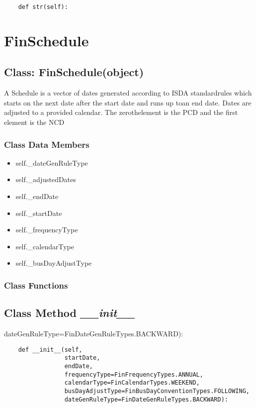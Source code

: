 \documentclass[twoside,11pt]{book}
\begin{document}
\begin{lstlisting}
    def str(self):
\end{lstlisting}

\newpage
\section{FinSchedule}

\subsection{Class: FinSchedule(object)}
A Schedule is a vector of dates generated according to ISDA standardrules which starts on the next date after the start date and runs up toan end date. Dates are adjusted to a provided calendar. The zerothelement is the PCD and the first element is the NCD 

\subsubsection{Class Data Members}
\begin{itemize}
\item{self.\_dateGenRuleType}
\item{self.\_adjustedDates}
\item{self.\_endDate}
\item{self.\_startDate}
\item{self.\_frequencyType}
\item{self.\_calendarType}
\item{self.\_busDayAdjustType}
\end{itemize}

\subsubsection{Class Functions}

\subsection{Class Method {\it \_\_init\_\_}}
dateGenRuleType=FinDateGenRuleTypes.BACKWARD):

\begin{lstlisting}
    def __init__(self,
                 startDate,
                 endDate,
                 frequencyType=FinFrequencyTypes.ANNUAL,
                 calendarType=FinCalendarTypes.WEEKEND,
                 busDayAdjustType=FinBusDayConventionTypes.FOLLOWING,
                 dateGenRuleType=FinDateGenRuleTypes.BACKWARD):
\end{lstlisting}
\end{document}

